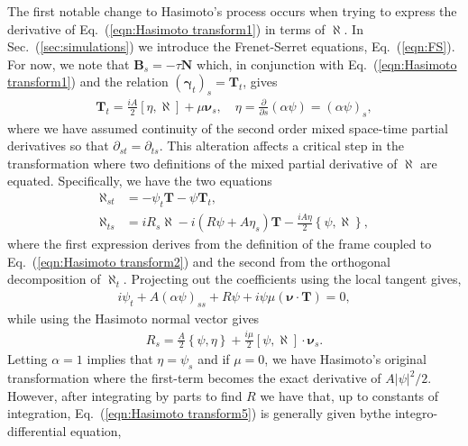 \documentclass[aps,graphicx,reprint,onecolumn,12pt,tightenlines,longbibliography]{revtex4-1}
\newcommand{\sas}[2]{{#2}}
\begin{document}
\sas{The first notable change to the process, due to Eq.~(), occurs when considering the dynamics of the local tangent vector,}{The first notable change to Hasimoto's process occurs when trying to express the derivative of Eq.~(\ref{eqn:Hasimoto transform1}) in terms of $\bm{\aleph}$. In Sec.~(\ref{sec:simulations}) we introduce the Frenet-Serret equations, Eq.~(\ref{eqn:FS}). For now, we note that $\textbf{B}_{s}=-\tau \textbf{N}$ which, in conjunction with Eq.~(\ref{eqn:Hasimoto transform1}) and the relation  $\left(\bm{\gamma}_{t}\right)_{s}=\textbf{T}_{t}$, gives}
%
\begin{align}\label{eqn:Hasimoto transform2}
{\textbf{T}}_{t} = \frac{i A}{2}\left[\eta, \bm{\aleph}\right] + \mu \bm{\nu}_{s}, \quad \eta = \frac{\partial}{\partial s}\left(\alpha \psi\right)=\left(\alpha \psi\right)_{s},
\end{align}
%
\sas{}{where we have assumed continuity of the second order mixed space-time partial derivatives so that $\partial_{st}=\partial_{ts}$.}
 This alteration affects a critical step in the transformation where two definitions of the mixed partial derivative of $\bm{\aleph}$ are equated. Specifically, we have the two equations
%
\begin{align}
\label{eqn:Hasimoto transform3} \bm{\aleph}_{st}&=-\psi_{t}{\textbf{T}} - \psi {\textbf{T}}_{t},\\
\label{eqn:Hasimoto transform4} \bm{\aleph}_{ts}&=iR_{s} \bm{\aleph}-i\left( R \psi +   A \eta_{s}\right) {\textbf{T}} - \frac{iA\eta}{2} \left\{ \psi,\bm{\aleph} \right\},
\end{align}
%
where the first expression derives from the definition of the frame coupled to Eq.~(\ref{eqn:Hasimoto transform2}) and the second from the orthogonal decomposition of ${\bm{\aleph}_{t}}$. Projecting out the coefficients using the local tangent gives,
%
\begin{align}
\label{eqn:Hasimoto transform5} i\psi_{t} + A(\alpha \psi)_{ss} + R \psi + i \psi\mu (\bm{\nu}\cdot {\textbf{T}}) =0,
\end{align}
%
while using the Hasimoto normal vector gives
%
\begin{align}
\label{eqn:Hasimoto transform6} R_{s} = \frac{A}{2}\left\{ \psi,\eta \right\}  + \frac{i \mu}{2} \left[\psi, \bm{\aleph}\right]\cdot \bm{\nu}_{s}.
\end{align}
%
Letting $\alpha=1$ implies that $\eta=\psi_{s}$ and if $\mu=0$, we have Hasimoto's original transformation where the first-term becomes the exact derivative of $A|\psi|^{2}/2$. However, after integrating by parts to find $R$ we have that, up to constants of integration, Eq.~(\ref{eqn:Hasimoto transform5}) is generally given by\sas{,}{the integro-differential equation,}
\end{document}

